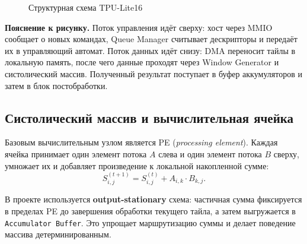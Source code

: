 \documentclass[12pt,a4paper]{article}
\begin{document}
\begin{figure}[H]
{
    }
    \caption{Структурная схема TPU-Lite16}
    \label{fig:global-architecture}
\end{figure}

\textbf{Пояснение к рисунку.} Поток управления идёт сверху: хост через MMIO сообщает о новых командах, Queue Manager считывает дескрипторы и передаёт их в управляющий автомат. Поток данных идёт снизу: DMA переносит тайлы в локальную память, после чего данные проходят через Window Generator и систолический массив. Полученный результат поступает в буфер аккумуляторов и затем в блок постобработки.

\subsection{Систолический массив и вычислительная ячейка}

Базовым вычислительным узлом является PE (\textit{processing element}). Каждая ячейка принимает один элемент потока \(A\) слева и один элемент потока \(B\) сверху, умножает их и добавляет произведение к локальной накопленной сумме:
\[
S_{i,j}^{(t+1)} = S_{i,j}^{(t)} + A_{i,k} \cdot B_{k,j}.
\]

В проекте используется \textbf{output-stationary} схема: частичная сумма фиксируется в пределах PE до завершения обработки текущего тайла, а затем выгружается в \texttt{Accumulator Buffer}. Это упрощает маршрутизацию суммы и делает поведение массива детерминированным.
\end{document}
